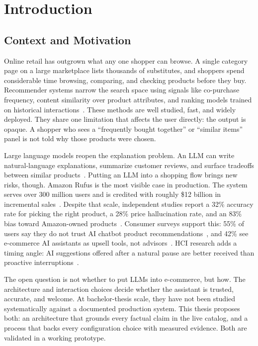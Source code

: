 \chapter{Introduction}
\label{chap:intro}

\section{Context and Motivation}
\label{sec:intro-context}

Online retail has outgrown what any one shopper can browse. A
single category page on a large marketplace lists thousands of
substitutes, and shoppers spend considerable time browsing,
comparing, and checking products before they buy. Recommender systems
narrow the search space using signals like co-purchase frequency,
content similarity over product attributes, and ranking models
trained on historical
interactions~\cite{ComprehensiveRecSys2024, LLM4Rec2025}. These
methods are well studied, fast, and widely deployed. They share
one limitation that affects the user directly: the output is
opaque.
A shopper who sees a ``frequently bought together'' or
``similar items'' panel is not told why those products were
chosen.

Large language models reopen the explanation problem. An LLM can
write natural-language explanations, summarize customer reviews,
and surface tradeoffs between similar
products~\cite{LLMEnhancedRecSys2024, ExplainableRecKG2024}.
Putting an LLM into a shopping flow brings new risks, though.
Amazon Rufus is the most visible case in production. The system
serves over 300 million users and is credited with roughly
\$12 billion in incremental sales~\cite{RufusRevenue2025}.
Despite that scale, independent studies report a 32\% accuracy
rate for picking the right product, a 28\% price hallucination
rate, and an 83\% bias toward Amazon-owned
products~\cite{RufusWrong2024,RufusConfidentlyWrong2024}.
Consumer surveys support this: 55\% of users say they do not
trust AI chatbot product
recommendations~\cite{ConsumerDistrust2025}, and 42\% see
e-commerce AI assistants as upsell tools, not
advisors~\cite{AIUpsell2025}. HCI research adds a timing angle:
AI suggestions offered after a natural pause are better received
than proactive interruptions~\cite{CHI2024Timing}.

The open question is not whether to put LLMs into e-commerce,
but how. The architecture and interaction choices decide whether
the assistant is trusted, accurate, and welcome. At
bachelor-thesis scale, they have not been studied systematically
against a documented production system. This thesis proposes
both: an architecture that grounds every factual claim in the
live catalog, and a process that backs every configuration
choice with measured evidence. Both are validated in a working
prototype.

